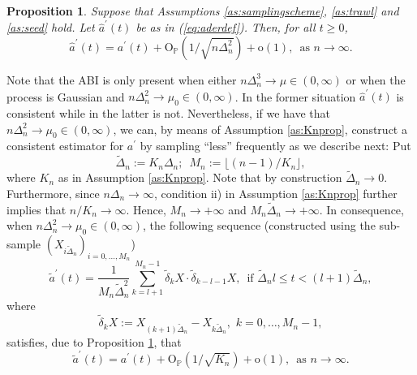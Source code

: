 \documentclass{article}
\theoremstyle{plain}
\newtheorem{proposition}{Proposition}
\theoremstyle{definition}
\theoremstyle{remark}
\begin{document}
\begin{proposition}\label{ABIconv} Suppose that Assumptions  \ref{as:samplingscheme}, \ref{as:trawl} and
	\ref{as:seed}
	hold. Let $\hat{a}^{\prime}(t)$ be as in (\ref{eq:aderdef}). Then, for all $t\geq0$,
	\[ \hat{a}^{\prime}(t)=a^{\prime}(t)+\mathrm{O}_{\mathbb{P}}\left(1/\sqrt{n\Delta_{n}^{2}}\right)+\mathrm{o}(1),\,\,\,\text{as }n\rightarrow\infty. \]\end{proposition}

Note that the ABI is only present when either $n\Delta_{n}^{3}\rightarrow\mu\in(0,\infty)$
or when the process is Gaussian and $n\Delta_{n}^{2}\rightarrow\mu_{0}\in(0,\infty)$.
In the former situation $\hat{a}^{\prime}(t)$ is consistent while in the latter is not.
Nevertheless, if we have that $n\Delta_{n}^{2}\rightarrow\mu_{0}\in(0,\infty)$,
we can, by means of Assumption \ref{as:Knprop}, construct a consistent estimator for $a^\prime$ by sampling ``less'' frequently as we describe next: Put
\[
\tilde{\Delta}_{n}:=K_{n}\Delta_{n};\,\,\,M_{n}:=\lfloor(n-1)/K_{n}\rfloor,
\]
where $K_{n}$ as in Assumption \ref{as:Knprop}. Note that by construction
$\tilde{\Delta}_{n}\rightarrow0$. Furthermore, since  $n\Delta_n\rightarrow\infty$, condition ii) in Assumption \ref{as:Knprop} further implies that $n/K_n\rightarrow\infty$. Hence, $M_{n}\rightarrow+\infty$
and $M_{n}\tilde{\Delta}_{n}\rightarrow+\infty$. In consequence, 
when $n\Delta_{n}^{2}\rightarrow\mu_{0}\in(0,\infty)$, the following sequence (constructed using the sub-sample $(X_{i\tilde{\Delta}_{n}})_{i=0,\ldots,M_n}$) 
\begin{equation}
	\tilde{a}^{\prime}(t)=\frac{1}{M_{n}\tilde{\Delta}_{n}^{2}}\sum_{k=l+1}^{M_{n}-1}\tilde{\delta}_{k}X\cdot\tilde{\delta}_{k-l-1}X,\,\,\,\text{if }\tilde{\Delta}_{n}l\leq t<(l+1)\tilde{\Delta}_{n},\label{eq:derivasubsample}
\end{equation}
where 
\[
\tilde{\delta}_{k}X:=X_{(k+1)\tilde{\Delta}_{n}}-X_{k\tilde{\Delta}_{n}},\,\,k=0,\ldots,M_{n}-1,
\]
satisfies, due to Proposition \ref{ABIconv}, that 
\[ 	\tilde{a}^{\prime}(t)=a^{\prime}(t)+\mathrm{O}_{\mathbb{P}}(1/\sqrt{K_n})+\mathrm{o}(1),\,\,\,\text{as }n\rightarrow\infty. \]
\end{document}
